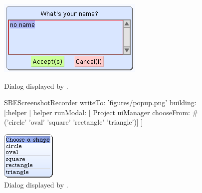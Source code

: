 \documentclass[a4paper,10pt,twoside]{book}
\begin{document}
\begin{figure}[htb]
\begin{minipage}{0.363\textwidth}
	\centerline{\includegraphics[width=\textwidth]{dialog}}
	\caption{Dialog displayed by .
		\label{fig:dialogName}}
\end{minipage}
\hfill
\begin{ExecuteSmalltalkScript}
SBEScreenshotRecorder writeTo: 'figures/popup.png' building: [:helper |
	helper runModal: [
		Project uiManager
			chooseFrom: #('circle' 'oval' 'square' 'rectangle' 'triangle')]
]
\end{ExecuteSmalltalkScript}
\begin{minipage}{0.587\textwidth}
	\vfill
	\centerline{\includegraphics[width=\textwidth]{popup}}
	\vfill
	\vspace{4ex}
	\caption{Dialog displayed by .}
\end{minipage}
\end{figure}
\end{document}
